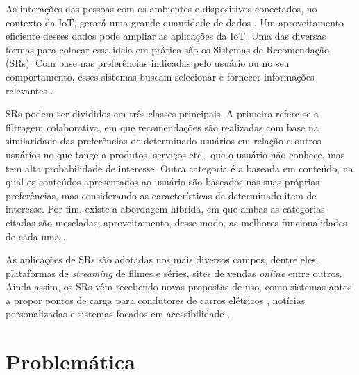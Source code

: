 As interações das pessoas com os ambientes e dispositivos conectados, no contexto da IoT, gerará uma grande quantidade de dados \cite{Chiang2016}. Um aproveitamento eficiente desses dados pode ampliar as aplicações da IoT. Uma das diversas formas para colocar essa ideia em prática são os Sistemas de Recomendação (SRs). Com base nas preferências indicadas pelo usuário ou no seu comportamento, esses sistemas buscam selecionar e fornecer informações relevantes \cite{Filho2008}. 

SRs podem ser divididos em três classes principais. A primeira refere-se a filtragem colaborativa, em que recomendações são realizadas com base na similaridade das preferências de determinado usuários em relação a outros usuários no que tange a produtos, serviços etc., que o usuário não conhece, mas tem alta probabilidade de interesse. Outra categoria é a baseada em conteúdo, na qual os conteúdos apresentados ao usuário são baseados nas suas próprias preferências, mas considerando as características de determinado item de interesse. Por fim, existe a abordagem híbrida, em que ambas as categorias citadas são mescladas, aproveitamento, desse modo, as melhores funcionalidades de cada uma \cite{Thomas2016}.

As aplicações de SRs são adotadas nos mais diversos campos, dentre eles, plataformas de \textit{streaming} de filmes e séries, sites de vendas \textit{online} entre outros. Ainda assim, os SRs vêm recebendo novas propostas de uso, como sistemas aptos a propor pontos de carga para condutores de carros elétricos \cite{Ferreira2011}, notícias personalizadas \cite{Yeung2010} e sistemas focados em acessibilidade \cite{GomesCardoso2016}. 


\section{Problemática}



